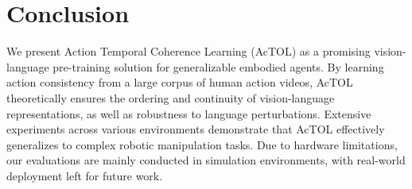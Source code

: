 \section{Conclusion}
We present Action Temporal Coherence Learning (AcTOL) as a promising vision-language pre-training solution for generalizable embodied agents. By learning action consistency from a large corpus of human action videos, AcTOL theoretically ensures the ordering and continuity of vision-language representations, as well as robustness to language perturbations. Extensive experiments across various environments demonstrate that AcTOL effectively generalizes to complex robotic manipulation tasks. Due to hardware limitations, our evaluations are mainly conducted in simulation environments, with real-world deployment left for future work.

